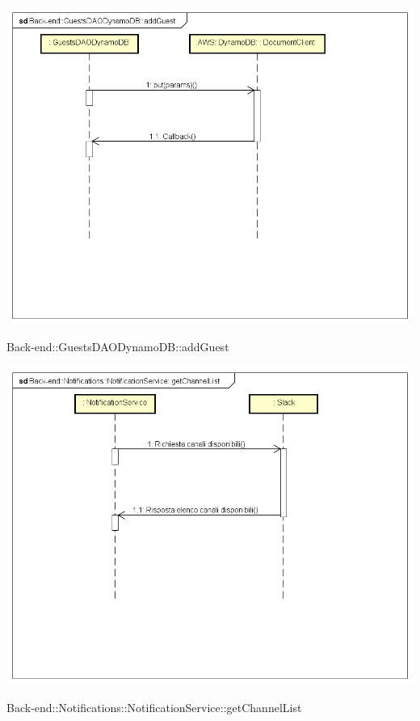 \includegraphics[width=\textwidth,height=\textheight,keepaspectratio]{images/diagrams/back-end/Ufficial_Backend/Back-end__GuestsDAODynamoDB__addGuest.png} 	\caption{Back-end::GuestsDAODynamoDB::addGuest}
\includegraphics[width=\textwidth,height=\textheight,keepaspectratio]{images/diagrams/back-end/Ufficial_Backend/Back-end__Notifications__NotificationService__getChannelList.png} 	\caption{Back-end::Notifications::NotificationService::getChannelList}
